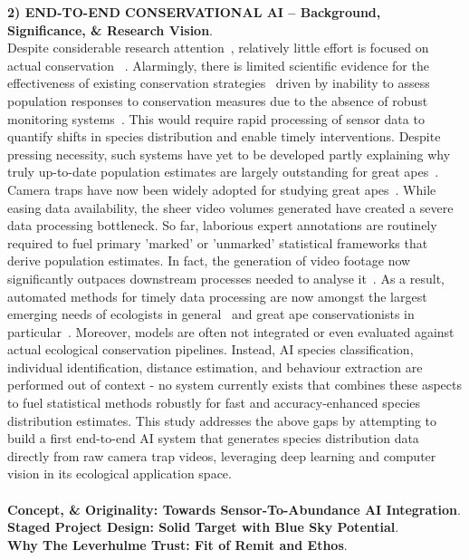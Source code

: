 \documentclass{article}
\newcommand{\tb}[1]{\textcolor[rgb]{0,0,0.5}{#1}}
\begin{document}
\tb{\textbf{2) END-TO-END CONSERVATIONAL AI -- Background, Significance, \& Research Vision}.\\
Despite considerable research attention~\cite{Marshall2016}, relatively little effort is focused on actual conservation ~\cite{Bezanson2019}. Alarmingly, there is limited scientific evidence for the effectiveness of existing conservation strategies~\cite{Junker2020,Junker2017} driven by inability to assess population responses to conservation measures due to the absence of robust monitoring systems~\cite{Witmer2005,Junker2020}. This would require rapid  processing of sensor data to quantify shifts in species distribution and enable timely interventions. Despite pressing necessity, such systems have yet to be developed partly explaining why truly up-to-date population estimates are largely outstanding for great apes~\cite{Campbell2008, Walsh2008, Plumptre2010, Morgan2011, ArcusFoundation2014, Humle2016}. Camera traps have now been widely adopted for studying great apes~\cite{Burton2015, Tuia2022}. While easing data availability, the sheer video volumes generated have created a severe data processing bottleneck. So far, laborious expert annotations are routinely required to fuel primary 'marked' or 'unmarked' statistical frameworks that derive population estimates. In fact, the generation of video footage now significantly outpaces downstream processes needed to analyse it~\cite{Hebblewhite2010, Burton2015, Tuia2022, Pollock2025}. As a result, automated methods for timely data processing are now amongst the largest emerging needs of ecologists in general~\cite{Nathan2022} and great ape conservationists in particular~\cite{}. Moreover, models are often not integrated or even evaluated against actual ecological conservation pipelines. Instead, AI species classification, individual identification, distance estimation, and behaviour extraction are performed out of context - no system currently exists that combines these aspects to fuel statistical methods robustly for fast and accuracy-enhanced species distribution estimates. This study addresses the above gaps by attempting to build a first end-to-end AI system that generates species distribution data directly from raw camera trap videos, leveraging deep learning and computer vision in its ecological application space.} \\ \ \\
\textbf{Concept, \& Originality: Towards Sensor-To-Abundance AI Integration}.\\
\textbf{Staged Project Design: Solid Target with Blue Sky Potential}.\\
\textbf{Why The Leverhulme Trust: Fit of Remit and Ethos}.
\end{document}

